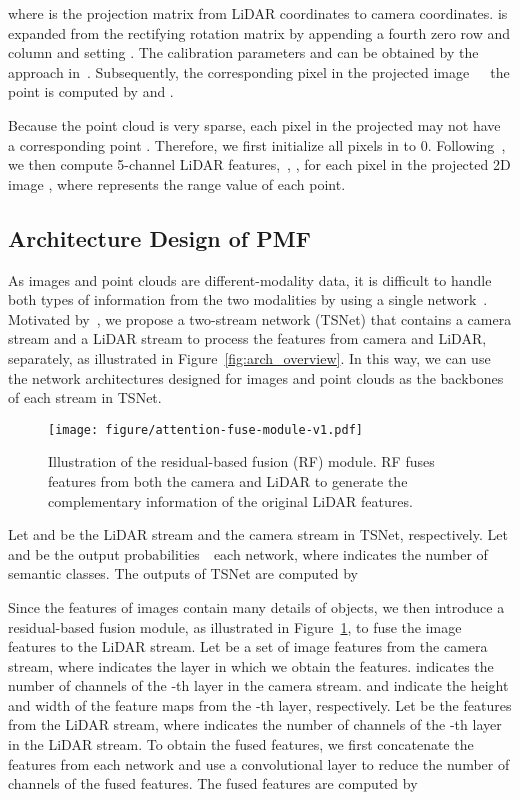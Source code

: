 \documentclass[10pt,twocolumn,letterpaper]{article}
\newcommand{\ice}[1]{{\color{black}#1}}
\begin{document}
where  is the projection matrix from LiDAR coordinates to camera coordinates.  is expanded from the rectifying rotation matrix  by appending a fourth zero row and column and setting . The calibration parameters  and  can be obtained by the approach in~\cite{geiger2012toolbox}. Subsequently, the corresponding pixel  in the projected image~~\wrt~the point  is computed by  and .


Because the point cloud is very sparse, each pixel in the projected  may not have a corresponding point . Therefore, we first initialize all pixels in  to 0. Following~\cite{cortinhal2020salsanext}, we then compute 5-channel LiDAR features,~\ie, , for each pixel  in the projected 2D image , where  represents the range value of each point.


\subsection{Architecture Design of PMF}
\label{sec:arch}

\ice{As images and point clouds are different-modality data, it is difficult to handle both types of information from the two modalities by using a single network~\cite{krispel2020fuseseg}.} 
Motivated by~\cite{feichtenhofer2016convolutional,simonyan2014two}, we propose a two-stream network (TSNet) that contains a camera stream and a LiDAR stream to process the features from camera and LiDAR, separately, as illustrated in Figure~\ref{fig:arch_overview}. In this way, we can use the network architectures designed for images and point clouds as the backbones of each stream in TSNet. 

\begin{figure}[t]
    \centering
    \texttt{[image: figure/attention-fuse-module-v1.pdf]}
    \caption{Illustration of the residual-based fusion (RF) module. RF fuses  features from both the camera and LiDAR to generate the complementary information of the original LiDAR features.}
    \label{fig:fusion_module}
\end{figure}

Let  and  be the LiDAR stream and the camera stream in TSNet, respectively. Let  and  be the output probabilities~\wrt~each network, where  indicates the number of semantic classes. The outputs of TSNet are computed by



Since the features of images contain many details of objects, we then introduce a residual-based fusion module, as illustrated in Figure~\ref{fig:fusion_module}, to fuse the image features to the LiDAR stream. Let  be a set of image features from the camera stream, where  indicates the layer in which we obtain the features.  indicates the number of channels of the -th layer in the camera stream.  and  indicate the height and width of the feature maps from the -th layer, respectively. Let  be the features from the LiDAR stream, where  indicates the number of channels of the -th layer in the LiDAR stream. To obtain the fused features, we first concatenate the features from each network and use a convolutional layer to reduce the number of channels of the fused features. The fused features  are computed by 
 
\end{document}
